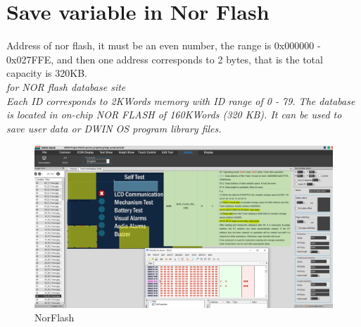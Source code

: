\documentclass[12pt, A4]{article} %
\begin{document}
\newpage

\section{Save variable in Nor Flash}

Address of nor flash, it must be an even number, the range is 0x000000 - 0x027FFE, and then one address corresponds to 2 bytes, that is the total capacity is 320KB.\\

\emph{for NOR flash database site \\
Each ID corresponds to 2KWords memory with ID range of 0 - 79.
The database is located in on-chip NOR FLASH of 160KWords (320 KB). It
can be used to save user data or DWIN OS program library files.}


\begin{figure}[!htb] %
	\centering
	\includegraphics[width=14cm]{NorFlash} 
	\caption{NorFlash}
\end{figure}

\newpage
\end{document}
